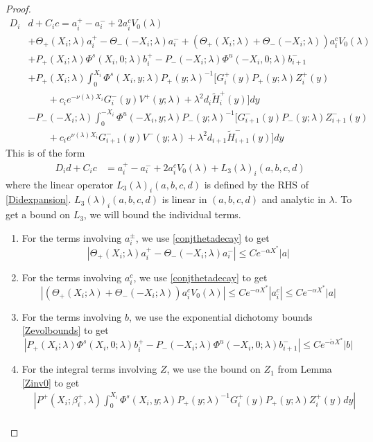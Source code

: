 \documentclass[thesis.tex]{subfiles}
\begin{document}
\begin{lemma}
\begin{proof}
\begin{equation}
\begin{aligned}
D_i &d + C_i c= a_i^+ - a_i^- + 2 a_i^c V_0(\lambda) \\
&+ \Theta_+(X_i; \lambda)a_i^+ - \Theta_-(-X_i; \lambda)a_i^- + (\Theta_+(X_i; \lambda) + \Theta_-(-X_i; \lambda)) a_i^c V_0(\lambda)\\
&+ P_+(X_i; \lambda)\Phi^s(X_i, 0; \lambda) b_i^+ - P_-(-X_i; \lambda)\Phi^u(-X_i, 0; \lambda) b_{i+1}^- \\
&+ P_+(X_i; \lambda) \int_0^{X_i} \Phi^s(X_i, y; \lambda) P_+(y; \lambda)^{-1}\big[ G_i^+(y) P_+(y; \lambda) Z_i^+(y) \\
&\qquad+ c_i e^{-\nu(\lambda)X_i} G_i^-(y) V^+(y; \lambda) + \lambda^2 d_i \tilde{H}_i^+(y)\big] dy \\ 
&- P_-(-X_i; \lambda) \int_0^{-X_i} \Phi^u(-X_i, y; \lambda) P_-(y; \lambda)^{-1}\big[ G_{i+1}^-(y) P_-(y; \lambda)Z_{i+1}^-(y) \\
&\qquad+ c_i e^{\nu(\lambda)X_i} G_{i+1}^-(y) V^-(y; \lambda) + \lambda^2 d_{i+1} \tilde{H}_{i+1}^-(y)\big] dy
\end{aligned}
\end{equation}
This is of the form
\begin{align}\label{Dideq1}
D_i d + C_i c &= a_i^+ - a_i^- + 2 a_i^c V_0(\lambda) + L_3(\lambda)_i(a, b, c, d)
\end{align}
where the linear operator $L_3(\lambda)_i(a, b, c, d)$ is defined by the RHS of \cref{Didexpansion}. $L_3(\lambda)_i(a, b, c, d)$ is linear in $(a,b,c,d)$ and analytic in $\lambda$. To get a bound on $L_3$, we will bound the individual terms. 
\begin{enumerate}
\item For the terms involving $a_i^\pm$, we use \eqref{conjthetadecay} to get
\[
|\Theta_+(X_i; \lambda)a_i^+ - \Theta_-(-X_i; \lambda)a_i^-| \leq C e^{-\alpha X^*}|a|
\]
\item For the terms involving $a_i^c$, we use \eqref{conjthetadecay} to get
\[
|(\Theta_+(X_i; \lambda) + \Theta_-(-X_i; \lambda))a_i^c V_0(\lambda)| \leq 
C e^{-\alpha X^*} |a_i^c| \leq C e^{-\alpha X^*}|a|
\]
\item For the terms involving $b$, we use the exponential dichotomy bounds \eqref{Zevolbounds} to get
\[
| P_+(X_i; \lambda)\Phi^s(X_i, 0; \lambda) b_i^+ - P_-(-X_i; \lambda) \Phi^u(-X_i, 0; \lambda) b_{i+1}^-| \leq C e^{-\tilde{\alpha} X^*} |b|
\]
\item For the integral terms involving $Z$, we use the bound on $Z_1$ from Lemma \ref{Zinv0} to get
\begin{align*}
&\left|
P^+(X_i; \beta_i^+, \lambda) \int_0^{X_i} \Phi^s(X_i, y; \lambda) P_+(y; \lambda)^{-1} G_i^+(y) P_+(y; \lambda) Z_i^+(y) dy \right| \\

\end{align*}
\end{enumerate}
\end{proof}
\end{lemma}
\end{document}

